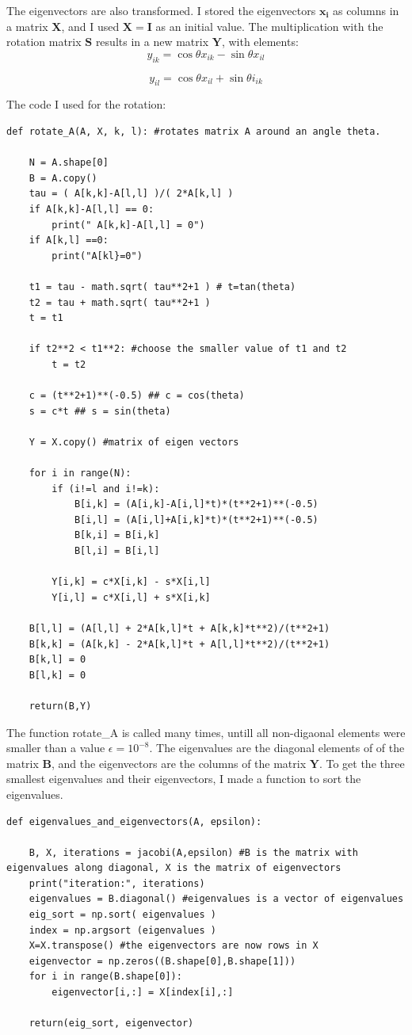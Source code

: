 \documentclass{article}
\begin{document}
The eigenvectors are also transformed. I stored the eigenvectors $\bm{x_i}$ as columns in a matrix $\bm{X}$, and I used $\bm{X}=\bm{I}$ as an initial value. The multiplication with the rotation matrix $\bm{S}$ results in a new matrix $\bm{Y}$, with elements:
$$
y_{ik}=\cos{\theta}x_{ik}-\sin{\theta}x_{il}
$$

$$
y_{il}=\cos{\theta}x_{il}+\sin{\theta}i_{ik}
$$

The code I used for the rotation:
\begin{verbatim}
def rotate_A(A, X, k, l): #rotates matrix A around an angle theta. 
	
	N = A.shape[0]
	B = A.copy()
	tau = ( A[k,k]-A[l,l] )/( 2*A[k,l] )
	if A[k,k]-A[l,l] == 0:
		print(" A[k,k]-A[l,l] = 0")
	if A[k,l] ==0:
		print("A[kl}=0")

	t1 = tau - math.sqrt( tau**2+1 ) # t=tan(theta)
	t2 = tau + math.sqrt( tau**2+1 )
	t = t1
	
	if t2**2 < t1**2: #choose the smaller value of t1 and t2
		t = t2
	
	c = (t**2+1)**(-0.5) ## c = cos(theta)
	s = c*t ## s = sin(theta)
	
	Y = X.copy() #matrix of eigen vectors

	for i in range(N):
		if (i!=l and i!=k):
			B[i,k] = (A[i,k]-A[i,l]*t)*(t**2+1)**(-0.5)
			B[i,l] = (A[i,l]+A[i,k]*t)*(t**2+1)**(-0.5)
			B[k,i] = B[i,k]
			B[l,i] = B[i,l]

		Y[i,k] = c*X[i,k] - s*X[i,l] 
		Y[i,l] = c*X[i,l] + s*X[i,k]

	B[l,l] = (A[l,l] + 2*A[k,l]*t + A[k,k]*t**2)/(t**2+1)
	B[k,k] = (A[k,k] - 2*A[k,l]*t + A[l,l]*t**2)/(t**2+1)
	B[k,l] = 0
	B[l,k] = 0

	return(B,Y)

\end{verbatim}
The function rotate\_A is called many times, untill all non-digaonal elements were smaller than a value $\epsilon=10^{-8}$. The eigenvalues are the diagonal elements of of the matrix $ \bm{B} $, and the eigenvectors are the columns of the matrix $ \bm{Y} $. To get the three smallest eigenvalues and their eigenvectors, I made a function to sort the eigenvalues. 
\begin{verbatim}
def eigenvalues_and_eigenvectors(A, epsilon):
	
	B, X, iterations = jacobi(A,epsilon) #B is the matrix with eigenvalues along diagonal, X is the matrix of eigenvectors
	print("iteration:", iterations)
	eigenvalues = B.diagonal() #eigenvalues is a vector of eigenvalues
	eig_sort = np.sort( eigenvalues )
	index = np.argsort (eigenvalues )
	X=X.transpose() #the eigenvectors are now rows in X
	eigenvector = np.zeros((B.shape[0],B.shape[1]))
	for i in range(B.shape[0]):
		eigenvector[i,:] = X[index[i],:]
	
	return(eig_sort, eigenvector)
\end{verbatim}
\end{document}
